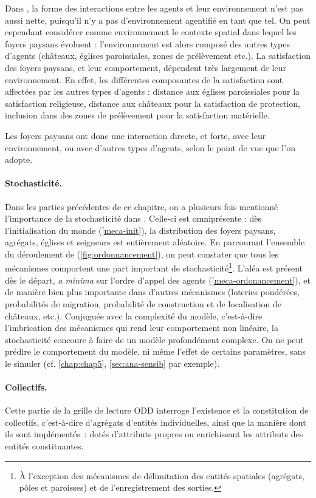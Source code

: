 Dans \simfeodal{}, la forme des interactions entre les agents et leur environnement n'est pas aussi nette, puisqu'il n'y a pas d'environnement \og agentifié\fg{} en tant que tel.
On peut cependant considérer comme environnement le contexte spatial dans lequel les foyers paysans évoluent :
	l'environnement est alors composé des autres types d'agents (châteaux, églises paroissiales, zones de prélèvement etc.).
La satisfaction des foyers paysans, et leur comportement, dépendent très largement de leur environnement.
En effet, les différentes composantes de la satisfaction sont affectées par les autres types d'agents :
	distance aux églises paroissiales pour la satisfaction religieuse, distance aux châteaux pour la satisfaction de protection, inclusion dans des zones de prélèvement pour la satisfaction matérielle.

Les foyers paysans ont donc une interaction directe, et forte, avec leur environnement, ou avec d'autres types d'agents, selon le point de vue que l'on adopte.

\paragraph{Stochasticité.} Dans les parties précédentes de ce chapitre, on a plusieurs fois mentionné l'importance de la stochasticité dans \simfeodal{}.
Celle-ci est omniprésente : dès l'initialisation du monde (\cref{meca-init}), la distribution des foyers paysans, agrégats, églises et seigneurs est entièrement aléatoire.
En parcourant l'ensemble du déroulement de \simfeodal{} (\cref{fig:ordonnancement}), on peut constater que tous les mécanismes comportent une part important de stochasticité\footnote{
	À l'exception des mécanismes de \og délimitation\fg{} des entités spatiales (agrégats, pôles et paroisses) et de l'enregistrement des sorties.
}.
L'aléa est présent dès le départ, \textit{a minima} sur l'ordre d'appel des agents (\cref{meca-ordonancement}), et de manière bien plus importante dans d'autres mécanismes (loteries pondérées, probabilités de migration, probabilité de construction et de localisation de châteaux, etc.).
Conjuguée avec la complexité du modèle, c'est-à-dire l'imbrication des mécanismes qui rend leur comportement non linéaire, la stochasticité concoure à faire de \simfeodal{} un modèle profondément complexe.
On ne peut prédire le comportement du modèle, ni même l'effet de certains paramètres, sans le simuler (cf. \cref{chap:chap5}, \cref{sec:ana-sensib} par exemple).

\paragraph{Collectifs.} Cette partie de la grille de lecture ODD interroge l'existence et la constitution de \og collectifs\fg{}, c'est-à-dire d'agrégats d'entités individuelles, ainsi que la manière dont ils sont implémentés : dotés d'attributs propres ou enrichissant les attributs des entités constituantes.


